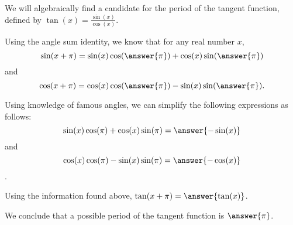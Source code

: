 \documentclass{ximera}
\author{Kenneth Berglund}
\begin{document}
We will algebraically find a candidate for the period of the tangent function, defined by $\tan(x) = \frac{\sin(x)}{\cos(x)}$.
\begin{exercise}
Using the angle sum identity, we know that for any real number $x$, 
$$
\sin(x + \pi)  = \sin(x)\cos(\answer{\pi}) + \cos(x)\sin(\answer{\pi})
$$
and
$$
\cos(x + \pi)  = \cos(x)\cos(\answer{\pi}) - \sin(x)\sin(\answer{\pi}).
$$

\begin{exercise}
Using knowledge of famous angles, we can simplify the following expressions as follows: $$\sin(x)\cos(\pi) + \cos(x)\sin(\pi) = \answer{-\sin(x)}$$ and $$\cos(x)\cos(\pi) -\sin(x)\sin(\pi) = \answer{-\cos(x)}$$.

\begin{exercise}
Using the information found above, $\tan(x + \pi) = \answer{\tan(x)}$. 

\begin{exercise}
We conclude that a possible period of the tangent function is $\answer{\pi}$. 



\end{exercise}

\end{exercise}
\end{exercise}
\end{exercise}
\end{document}
